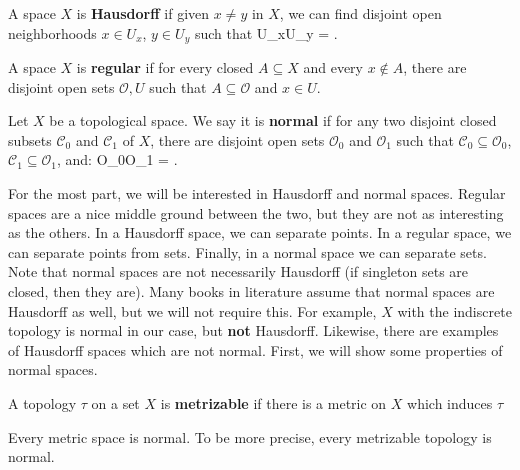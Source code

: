 	\begin{definition}[Hausdorff]
		A space $X$ is \textbf{Hausdorff} if given $x\neq y$ in $X$, we can find disjoint open neighborhoods $x\in U_x$, 
		$y\in U_y$ such that 
		\eq
			U_x\cap U_y = \emptyset.
		\qe
	\end{definition}
	
	\begin{definition}[Regular]
		A space $X$ is \textbf{regular} if for every closed $A\subseteq X$ and every $x\notin A$, there are disjoint open 
		sets $\mathcal O, U$ such that $A\subseteq\mathcal O$ and $x\in U$.
	\end{definition}
	
	\begin{definition}
		Let $X$ be a topological space. We say it is \textbf{normal} if for any two disjoint closed subsets $\mathcal C_0$ 
		and $\mathcal C_1$ of $X$, there are disjoint open sets $\mathcal O_0$ and $\mathcal O_1$ such that 
		$\mathcal C_0\subseteq\mathcal O_0$, $\mathcal C_1\subseteq\mathcal O_1$, and:
		\eq
			\mathcal O_0\cap\mathcal O_1 = \emptyset.
		\qe
	\end{definition}
	
	For the most part, we will be interested in Hausdorff and normal spaces. Regular spaces are a nice middle ground 
	between the two, but they are not as interesting as the others. In a Hausdorff space, we can separate points. In a 
	regular space, we can separate points from sets. Finally, in a normal space we can separate sets. Note that normal 
	spaces are not necessarily Hausdorff (if singleton sets are closed, then they are). Many books in literature assume that 
	normal spaces are Hausdorff as well, but we will not require this. For example, $X$ with the indiscrete topology is normal 
	in our case, but \textbf{not} Hausdorff. Likewise, there are examples of Hausdorff spaces which are not normal. First, we 
	will show some properties of normal spaces.
	
	\begin{definition}[Metrizable]
		A topology $\tau$ on a set $X$ is \textbf{metrizable} if there is a metric on $X$ which induces $\tau$
	\end{definition}
	
	\begin{theorem}
		Every metric space is normal. To be more precise, every metrizable topology is normal.
	\end{theorem}
	
